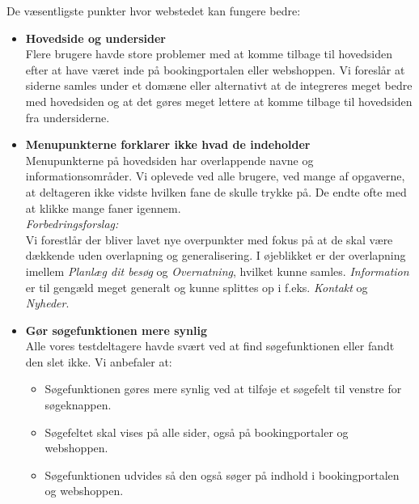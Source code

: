 \documentclass[10pt,a4paper]{article}      %
\newenvironment{forslag}{\emph{Forbedringsforslag:}\\[0.5mm]}{}
\begin{document}
\noindent De væsentligste punkter hvor webstedet kan fungere bedre:
\begin{itemize}
    \item \textbf{Hovedside og undersider}\\
        Flere brugere havde store problemer med at komme tilbage til hovedsiden efter at have
        været inde på bookingportalen eller webshoppen. Vi foreslår at siderne samles under et
        domæne eller alternativt at de integreres meget bedre med hovedsiden og at det gøres
        meget lettere at komme tilbage til hovedsiden fra undersiderne.

    \item \textbf{Menupunkterne forklarer ikke hvad de indeholder}\\
        Menupunkterne på hovedsiden har overlappende navne og informationsområder. Vi oplevede
        ved alle brugere, ved mange af opgaverne, at deltageren ikke vidste hvilken fane de
        skulle trykke på. De endte ofte med at klikke mange faner igennem.\\
        \begin{forslag}
            Vi forestlår der bliver lavet nye overpunkter med fokus på at de skal være
            dækkende uden overlapning og generalisering. I øjeblikket er der overlapning
            imellem \emph{Planlæg dit besøg} og \emph{Overnatning}, hvilket kunne samles.
            \emph{Information} er til gengæld meget generalt og kunne splittes op i f.eks.
            \emph{Kontakt} og \emph{Nyheder}.
        \end{forslag}

    \item \textbf{Gør søgefunktionen mere synlig}\\
        Alle vores testdeltagere havde svært ved at find søgefunktionen eller fandt den slet
        ikke. Vi anbefaler at:
        \begin{itemize}
            \item Søgefunktionen gøres mere synlig ved at tilføje et søgefelt til venstre for søgeknappen.
            \item Søgefeltet skal vises på alle sider, også på bookingportaler og webshoppen.
            \item Søgefunktionen udvides så den også søger på indhold i bookingportalen og webshoppen.
        \end{itemize}

\end{itemize}
\end{document}
